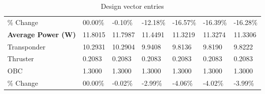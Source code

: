 \begin{table}[H]
\begin{tabular}{lllllll}
\% Change & 00.00\% &-0.10\% & -12.18\% & -16.57\% & -16.39\% & -16.28\% \\
\rowcolor[HTML]{EFEFEF} 
\cellcolor[HTML]{EFEFEF}\textbf{Average Power (W)} & \cellcolor[HTML]{EFEFEF}11.8015 & 11.7987 & 11.4491 & 11.3219 & 11.3274 & 11.3306 \\
Transponder & 10.2931 & 10.2904 & 9.9408 & 9.8136 & 9.8190 & 9.8222 \\
Thruster & 0.2083 & 0.2083 & 0.2083 & 0.2083 & 0.2083 & 0.2083 \\
OBC & 1.3000 & 1.3000 & 1.3000 & 1.3000 & 1.3000 & 1.3000 \\
\% Change & 00.00\% &-0.02\% & -2.99\% & -4.06\% & -4.02\% & -3.99\% \\
\end{tabular}
\caption{Design vector entries}
\label{tab:DesignVectorEntries_default56dur1len3intPropulsion}
\end{table}